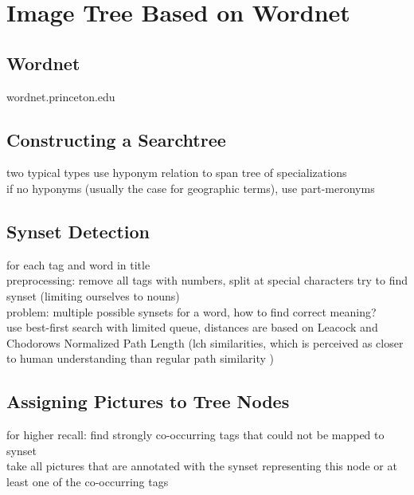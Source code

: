 %
\section{Image Tree Based on Wordnet}
\label{sec_wordnetsearchtree}

\subsection{Wordnet}
wordnet.princeton.edu

\subsection{Constructing a Searchtree}
two typical types 
use hyponym relation to span tree of specializations \\
if no hyponyms (usually the case for geographic terms), use part-meronyms \\

\subsection{Synset Detection}
for each tag and word in title \\
preprocessing: remove all tags with numbers, split at special characters
try to find synset (limiting ourselves to nouns) \\
problem: multiple possible synsets for a word, how to find correct meaning? \\
use best-first search with limited queue, distances are based on Leacock and Chodorows Normalized Path Length (lch similarities, which is perceived as closer to human understanding than regular path similarity \cite{budanitsky01} )

\subsection{Assigning Pictures to Tree Nodes}
for higher recall: find strongly co-occurring tags that could not be mapped to synset \\
take all pictures that are annotated with the synset representing this node or at least one of the co-occurring tags